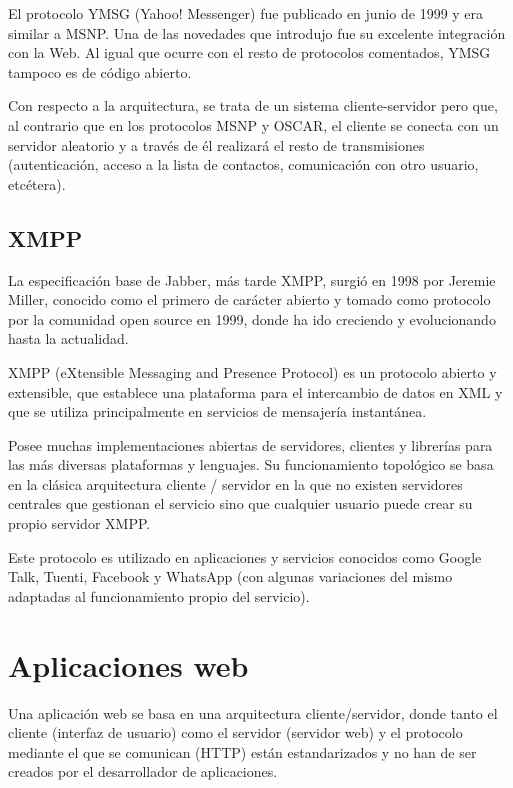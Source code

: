 El protocolo YMSG (Yahoo! Messenger) fue publicado en junio de 1999 y era similar a MSNP. Una de las novedades que introdujo fue su excelente integración con la Web. Al igual que ocurre con el resto de protocolos comentados, YMSG tampoco es de código abierto.

Con respecto a la arquitectura, se trata de un sistema cliente-servidor pero que, al contrario que en los protocolos MSNP y OSCAR, el cliente se conecta con un servidor aleatorio y a través de él realizará el resto de transmisiones (autenticación, acceso a la lista de contactos, comunicación con otro usuario, etcétera).

\subsection{XMPP}

La especificación base de Jabber, más tarde XMPP, surgió en 1998 por Jeremie Miller, conocido como el primero de carácter abierto y tomado como protocolo por la comunidad open source en 1999, donde ha ido creciendo y evolucionando hasta la actualidad.

XMPP (eXtensible Messaging and Presence Protocol) es un protocolo abierto y extensible, que establece una plataforma para el intercambio de datos en XML y que se utiliza principalmente en servicios de mensajería instantánea.

Posee muchas implementaciones abiertas de servidores, clientes y librerías para las más diversas plataformas y lenguajes. Su funcionamiento topológico se basa en la clásica arquitectura cliente / servidor en la que no existen servidores centrales que gestionan el servicio sino que cualquier usuario puede crear su propio servidor XMPP.

Este protocolo es utilizado en aplicaciones y servicios conocidos como Google Talk, Tuenti, Facebook y WhatsApp (con algunas variaciones del mismo adaptadas al funcionamiento propio del servicio).

\clearpage

\section{Aplicaciones web}

Una aplicación web se basa en una arquitectura cliente/servidor, donde tanto el cliente (interfaz de usuario) como el servidor (servidor web) y el protocolo mediante el que se comunican (HTTP) están estandarizados y no han de ser creados por el desarrollador de aplicaciones.

